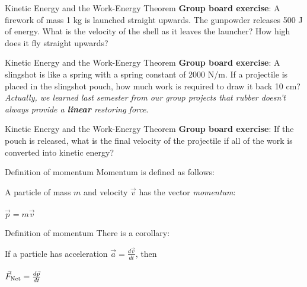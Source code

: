 \documentclass{beamer}
\begin{document}
\begin{frame}{Kinetic Energy and the Work-Energy Theorem}
\textbf{Group board exercise}: A firework of mass 1 kg is launched straight upwards.  The gunpowder releases 500 J of energy.  What is the velocity of the shell as it leaves the launcher?  How high does it fly straight upwards?
\end{frame}

\begin{frame}{Kinetic Energy and the Work-Energy Theorem}
\textbf{Group board exercise}: A slingshot is like a spring with a spring constant of 2000 N/m.  If a projectile is placed in the slingshot pouch, how much work is required to draw it back 10 cm? \\ \vspace{0.5cm}
\small
\textit{Actually, we learned last semester from our group projects that rubber doesn't always provide a \textbf{linear} restoring force}.
\end{frame}

\begin{frame}{Kinetic Energy and the Work-Energy Theorem}
\textbf{Group board exercise}: If the pouch is released, what is the final velocity of the projectile if all of the work is converted into kinetic energy?
\end{frame}

\begin{frame}{Definition of momentum}
Momentum is defined as follows: \\ \vspace{1cm}
\begin{tcolorbox}[colback=white,colframe=red!40!blue,title=Definition of Momentum]
\alert{A particle of mass $m$ and velocity $\vec{v}$ has the vector \textit{momentum}:} \\ \\
\alert{$\vec{p} = m\vec{v}$}
\end{tcolorbox}
\end{frame}

\begin{frame}{Definition of momentum}
There is a corollary: \\ \vspace{1cm}
\begin{tcolorbox}[colback=white,colframe=red!40!blue,title=Newton's Second Law with momentum]
\alert{If a particle has acceleration $\vec{a} = \frac{d\vec{v}}{dt}$, then} \\ \\
\alert{$\vec{F}_{\rm Net} = \frac{d\vec{p}}{dt}$}
\end{tcolorbox}
\end{frame}
\end{document}
